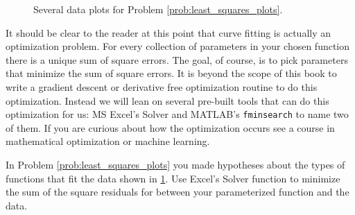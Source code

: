\begin{figure}
\begin{center}
    \end{center}
    \caption{Several data plots for Problem \ref{prob:least_squares_plots}.}
    \label{fig:plot_least_squares_prob}
\end{figure}

It should be clear to the reader at this point that curve fitting is actually an
optimization problem.  For every collection of parameters in your chosen function there is
a unique sum of square errors.  The goal, of course, is to pick parameters that minimize
the sum of square errors.  It is beyond the scope of this book to write a gradient
descent or derivative free optimization routine to do this optimization.  Instead we will
lean on several pre-built tools that can do this optimization for us: MS Excel's Solver
and MATLAB's \texttt{fminsearch} to name two of them.  If you are curious about how the
optimization occurs see a course in mathematical optimization or machine learning.

\begin{problem}
    In Problem \ref{prob:least_squares_plots} you made hypotheses about the types of
    functions that fit the data shown in \ref{fig:plot_least_squares_prob}.  Use Excel's
    Solver function to minimize the sum of the square residuals for between your
    parameterized function and the data.  
\end{problem}

